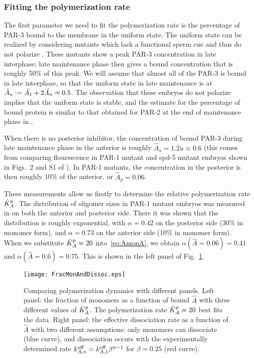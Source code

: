 \documentclass[11pt]{article}
\newcommand{\6}[1]{#1_{\text{6}}}
\newcommand{\3}[1]{#1_{\text{3}}}
\begin{document}
\subsubsection{Fitting the polymerization rate}
The first parameter we need to fit the polymerization rate is the percentage of PAR-3 bound to the membrane in the uniform state. The uniform state can be realized by considering mutants which lack a functional sperm cue and thus do not polarize \cite[Fig.~S1]{lang2023oligomerization}. These mutants show a peak PAR-3 concentration in late interphase; late maintenance phase then gives a bound concentration that is roughly 50\% of this peak. We will assume that almost all of the PAR-3 is bound in late interphase, so that the uniform state in late maintenance is at $\hat A_u:=\hat{A_1}+2\hat{A_n} \approx 0.5$. The observation that these embryos do not polarize implies that the uniform state is stable, and the estimate for the percentage of bound protein is similar to that obtained for PAR-2 at the end of maintenance phase in \cite[Fig.~S3]{gross2019guiding}. 

When there is no posterior inhibitor, the concentration of bound PAR-3 during late maintenance phase in the anterior is roughly $\hat A_a=1.2u \approx 0.6$ (this comes from comparing flourescence in PAR-1 mutant and spd-5 mutant embryos shown in Figs.\ 2 and S1 of \cite{lang2023oligomerization}). In PAR-1 mutants, the concentration in the posterior is then roughly 10\% of the anterior, or $\hat A_p=0.06$. 

These measurements allow us firstly to determine the relative polymerization rate $\hat{K}^\text{p}_A$. The distribution of oligomer sizes in PAR-1 mutant embryos was measured in \cite{lang2023oligomerization} on both the anterior and posterior side. There it was shown that the distribution is roughly exponential, with $\alpha=0.42$ on the posterior side (30\% in monomer form), and $\alpha=0.73$ on the anterior side (10\% in monomer form). When we substitute $\hat{K}^\text{p}_A=20$ into\ \eqref{eq:AmonA}, we obtain $\alpha(\hat A = 0.06)=0.41$ and $\alpha(\hat A = 0.6)=0.75$. This is shown in the left panel of Fig.\ \ref{fig:FracMonDissoc}.

\begin{figure}
\centering
\texttt{[image: FracMonAndDissoc.eps]}
\caption{\label{fig:FracMonDissoc}Comparing polymerization dynamics with different panels. Left panel: the fraction of monomers as a function of bound $\hat A$ with three different values of $\hat{K}^\text{p}_A$. The polymerization rate $\hat{K}^\text{p}_A=20$ best fits the data. Right panel: the effective dissociation rate as a function of $\hat A$ with two different assumptions: only monomers can dissociate (blue curve), and dissociation occurs with the experimentally determined rate $k^\text{off}_{A,n}=k^\text{off}_{A,1} \beta^{n-1}$ for $\beta=0.25$ (red curve).}
\end{figure}
\end{document}
